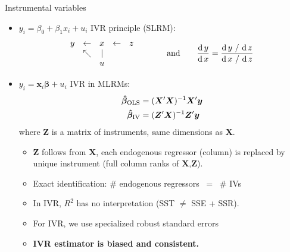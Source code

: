 \documentclass[usenames,dvipsnames]{beamer}
\begin{document}
\begin{frame}{Instrumental variables}
\begin{itemize}
    \item $y_i = \beta_0 + \beta_1 x_i + u_i$ \qquad IVR principle (SLRM):
    $$
    \begin{matrix}
    y & \leftarrow & x & \leftarrow & z \\
      & \nwarrow & | & &\\
      & & u & &
    \end{matrix}
    \qquad \qquad \textnormal{and} \qquad
    \frac{\textnormal{d} \, y}{\textnormal{d} \, x} = 
    \frac{\textnormal{d} \, y ~/~ \textnormal{d} \, z}
    {\textnormal{d} \, x ~/~ \textnormal{d} \, z}
    $$
    \item $y_i = \bm{x}_i \bm{\beta} + u_i$ \qquad IVR in MLRMs:
    \begin{align*}
    \bm{\hat{\beta}}_{\textnormal{OLS}} &= 
    (\bm{X}^{\prime}\bm{X})^{-1} \bm{X}^{\prime}\bm{y} \\
    \bm{\hat{\beta}}_{\textnormal{IV}} &= 
    (\bm{Z}^{\prime}\bm{X})^{-1} \bm{Z}^{\prime}\bm{y}
    \end{align*}
    where $\bm{Z}$ is a matrix of instruments, same dimensions as $\bm{X}$.
    \small{
    \begin{itemize}
        \item $\bm{Z}$ follows from $\bm{X}$, each endogenous regressor (column) is replaced by unique instrument (full column ranks of $\bm{X}$,$\bm{Z}$).
        \item Exact identification: \# endogenous regressors~ =~ \# IVs
        \item In IVR, $R^2$ has no interpretation (SST $\neq$ SSE + SSR).
        \item For IVR, we use specialized robust standard errors
        \item \textbf{IVR estimator is biased and consistent.}
    \end{itemize}
    }
\end{itemize}
\end{frame}
\end{document}

